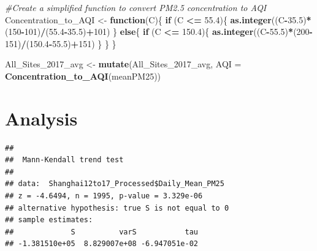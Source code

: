\documentclass[12pt,]{article}
\newenvironment{Shaded}{\begin{snugshade}}{\end{snugshade}}
\newcommand{\KeywordTok}[1]{\textcolor[rgb]{0.13,0.29,0.53}{\textbf{#1}}}
\newcommand{\DataTypeTok}[1]{\textcolor[rgb]{0.13,0.29,0.53}{#1}}
\newcommand{\DecValTok}[1]{\textcolor[rgb]{0.00,0.00,0.81}{#1}}
\newcommand{\FloatTok}[1]{\textcolor[rgb]{0.00,0.00,0.81}{#1}}
\newcommand{\StringTok}[1]{\textcolor[rgb]{0.31,0.60,0.02}{#1}}
\newcommand{\CommentTok}[1]{\textcolor[rgb]{0.56,0.35,0.01}{\textit{#1}}}
\newcommand{\ControlFlowTok}[1]{\textcolor[rgb]{0.13,0.29,0.53}{\textbf{#1}}}
\newcommand{\OperatorTok}[1]{\textcolor[rgb]{0.81,0.36,0.00}{\textbf{#1}}}
\newcommand{\NormalTok}[1]{#1}
\begin{document}
\begin{Shaded}
\begin{Highlighting}[]
\CommentTok{#Create a simplified function to convert PM2.5 concentration to AQI }
\NormalTok{Concentration_to_AQI <-}\StringTok{ }\ControlFlowTok{function}\NormalTok{(C)\{}
  \ControlFlowTok{if}\NormalTok{ (C }\OperatorTok{<=}\StringTok{ }\FloatTok{55.4}\NormalTok{)\{}
    \KeywordTok{as.integer}\NormalTok{((C}\OperatorTok{-}\FloatTok{35.5}\NormalTok{)}\OperatorTok{*}\NormalTok{(}\DecValTok{150}\OperatorTok{-}\DecValTok{101}\NormalTok{)}\OperatorTok{/}\NormalTok{(}\FloatTok{55.4}\OperatorTok{-}\FloatTok{35.5}\NormalTok{)}\OperatorTok{+}\DecValTok{101}\NormalTok{)}
\NormalTok{  \} }\ControlFlowTok{else}\NormalTok{\{}
    \ControlFlowTok{if}\NormalTok{ (C }\OperatorTok{<=}\StringTok{ }\FloatTok{150.4}\NormalTok{)\{}
      \KeywordTok{as.integer}\NormalTok{((C}\OperatorTok{-}\FloatTok{55.5}\NormalTok{)}\OperatorTok{*}\NormalTok{(}\DecValTok{200}\OperatorTok{-}\DecValTok{151}\NormalTok{)}\OperatorTok{/}\NormalTok{(}\FloatTok{150.4}\OperatorTok{-}\FloatTok{55.5}\NormalTok{)}\OperatorTok{+}\DecValTok{151}\NormalTok{)}
\NormalTok{    \}}
\NormalTok{  \}}
\NormalTok{\}}

\NormalTok{All_Sites_2017_avg <-}\StringTok{ }\KeywordTok{mutate}\NormalTok{(All_Sites_2017_avg, }\DataTypeTok{AQI =} \KeywordTok{Concentration_to_AQI}\NormalTok{(meanPM25))}
\end{Highlighting}
\end{Shaded}

\newpage

\section{Analysis}\label{analysis}

\begin{Shaded}
\end{Shaded}

\begin{verbatim}
## 
##  Mann-Kendall trend test
## 
## data:  Shanghai12to17_Processed$Daily_Mean_PM25
## z = -4.6494, n = 1995, p-value = 3.329e-06
## alternative hypothesis: true S is not equal to 0
## sample estimates:
##             S          varS           tau 
## -1.381510e+05  8.829007e+08 -6.947051e-02
\end{verbatim}
\end{document}
